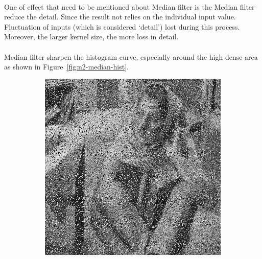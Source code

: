 \documentclass[12pt,a4paper]{report}
\begin{document}
\paragraph*{}One of effect that need to be mentioned about Median filter is the Median filter reduce the detail. Since the result not relies on the individual input value. Fluctuation of inputs (which is considered `detail') lost during this process. Moreover, the larger kernel size, the more loss in detail.
\paragraph*{}Median filter sharpen the histogram curve, especially around the high dense area as shown in Figure~\ref{fig:n2-median-hist}.

\begin{figure}[!htb]
  \begin{minipage}{\linewidth}
    \centering
    \begin{subfigure}{0.49\textwidth}
      \includegraphics[width=\linewidth]{test_img/noise1.png}
    \end{subfigure}
    \begin{subfigure}{0.49\textwidth}

\end{subfigure}
\end{minipage}
\end{figure}
\end{document}
